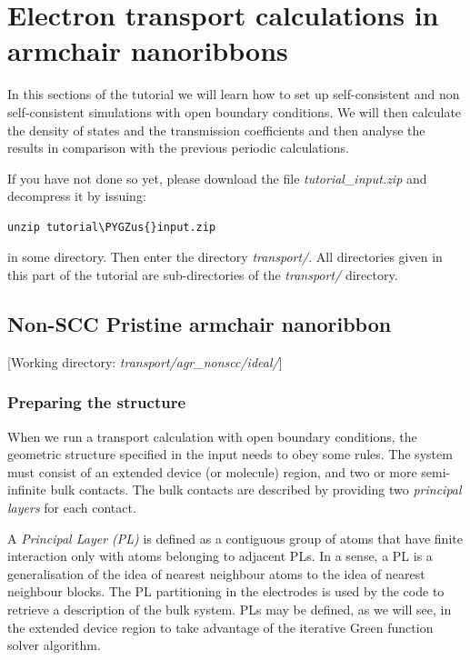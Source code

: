\documentclass[a4paper,11pt,english]{sphinxmanual}
\def\PYGZus{\char`\_}
\begin{document}
{{\chapter{Electron transport calculations in armchair nanoribbons}
\label{transport::doc}\label{transport:electron-transport-calculations-in-armchair-nanoribbons}
In this sections of the tutorial we will learn how to set up self-consistent and non self-consistent simulations with open boundary conditions. We will then
calculate the density of states and the transmission coefficients and then
analyse the results in comparison with the previous periodic
calculations.

If you have not done so yet, please download the file
\emph{tutorial\_input.zip} and decompress it by issuing:

\begin{Verbatim}[commandchars=\\\{\}]
unzip tutorial\PYGZus{}input.zip
\end{Verbatim}

in some directory. Then enter the directory \emph{transport/}. All
directories given in this part of the tutorial are sub-directories of
the \emph{transport/} directory.


\section{Non-SCC Pristine armchair nanoribbon}
\label{transport:non-scc-pristine-armchair-nanoribbon}
{[}Working directory: \emph{transport/agr\_nonscc/ideal/}{]}


\subsection{Preparing the structure}
\label{transport:preparing-the-structure}
When we run a transport calculation with open boundary conditions, the
geometric structure specified in the input needs to obey some
rules. The system must consist of an extended device (or molecule)
region, and two or more semi-infinite bulk contacts. The bulk contacts
are described by providing two \emph{principal layers} for each contact.

A \emph{Principal Layer (PL)} is defined as a contiguous group of atoms
that have finite interaction only with atoms belonging to adjacent
PLs. In a sense, a PL is a generalisation of the idea of nearest
neighbour atoms to the idea of nearest neighbour blocks. The PL
partitioning in the electrodes is used by the code to retrieve a
description of the bulk system. PLs may be defined, as we will see, in
the extended device region to take advantage of the iterative Green
function solver algorithm.

}}
\end{document}
